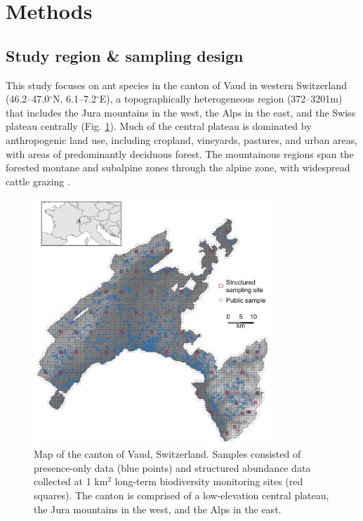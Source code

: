 \documentclass[preprint,review,times,12pt]{elsarticle}
\begin{document}
\section{Methods}
\label{S:2}
\subsection{Study region \& sampling design}
This study focuses on ant species in the canton of Vaud in western Switzerland (46.2–47.0$^{\circ}$N, 6.1–7.2$^{\circ}$E), a topographically heterogeneous region (372–3201m) that includes the Jura mountains in the west, the Alps in the east, and the Swiss plateau centrally (Fig. \ref{fig:VD_map}). Much of the central plateau is dominated by anthropogenic land use, including cropland, vineyards, pastures, and urban areas, with areas of predominantly deciduous forest. The mountainous regions span the forested montane and subalpine zones through the alpine zone, with widespread cattle grazing \citep{Delarze2015,Gago-Silva2017,Beck2017}. 

\begin{figure}
	\centering\includegraphics[width=3.5in]{ms/1_Ecography/1/figs/map_VD+inset.png}
	\caption{\label{fig:VD_map} Map of the canton of Vaud, Switzerland. Samples consisted of presence-only data (blue points) and structured abundance data collected at 1 km$^2$ long-term biodiversity monitoring sites (red squares). The canton is comprised of a low-elevation central plateau, the Jura mountains in the west, and the Alps in the east. }
\end{figure}
\end{document}
